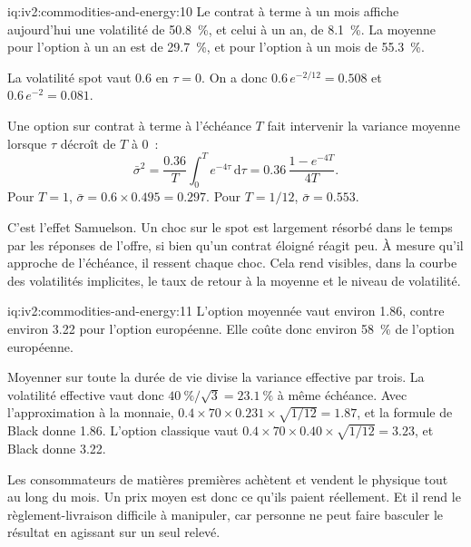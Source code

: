 \begin{solution}{iq:iv2:commodities-and-energy:10}
Le contrat à terme à un mois affiche aujourd'hui une volatilité de 50.8~\%, et celui à un an, de 8.1~\%. La moyenne pour l'option à un an est de 29.7~\%, et pour l'option à un mois de 55.3~\%.

La volatilité spot vaut $0.6$ en $\tau = 0$. On a donc $0.6\,e^{-2/12} = 0.508$ et $0.6\,e^{-2} = 0.081$.

Une option sur contrat à terme à l'échéance $T$ fait intervenir la variance moyenne lorsque $\tau$ décroît de $T$ à 0~:
\[
\bar\sigma^2 = \frac{0.36}{T}\int_0^T e^{-4\tau}\,\mathrm{d}\tau = 0.36\,\frac{1 - e^{-4T}}{4T}.
\]
Pour $T = 1$, $\bar\sigma = 0.6 \times 0.495 = 0.297$. Pour $T = 1/12$, $\bar\sigma = 0.553$.

C'est l'effet Samuelson. Un choc sur le spot est largement résorbé dans le temps par les réponses de l'offre, si bien qu'un contrat éloigné réagit peu. À mesure qu'il approche de l'échéance, il ressent chaque choc. Cela rend visibles, dans la courbe des volatilités implicites, le taux de retour à la moyenne et le niveau de volatilité.

\end{solution}

\begin{solution}{iq:iv2:commodities-and-energy:11}
L'option moyennée vaut environ 1.86, contre environ 3.22 pour l'option européenne. Elle coûte donc environ 58~\% de l'option européenne.

Moyenner sur toute la durée de vie divise la variance effective par trois. La volatilité effective vaut donc $40~\%/\sqrt{3} = 23.1~\%$ à même échéance. Avec l'approximation à la monnaie, $0.4 \times 70 \times 0.231 \times \sqrt{1/12} = 1.87$, et la formule de Black donne 1.86. L'option classique vaut $0.4 \times 70 \times 0.40 \times \sqrt{1/12} = 3.23$, et Black donne 3.22.

Les consommateurs de matières premières achètent et vendent le physique tout au long du mois. Un prix moyen est donc ce qu'ils paient réellement. Et il rend le règlement-livraison difficile à manipuler, car personne ne peut faire basculer le résultat en agissant sur un seul relevé.

\end{solution}

